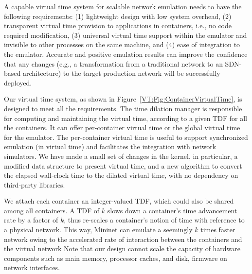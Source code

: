 A capable virtual time system for scalable network emulation needs to have the following requirements:
(1) lightweight design with low system overhead,
(2) transparent virtual time provision to applications in containers, i.e., no code required modification,
(3) universal virtual time support within the emulator and invisible to other processes on the same machine, and
(4) ease of integration to the emulator. 
Accurate and positive emulation results can improve the confidence that any changes
(e.g., a transformation from a traditional network to an SDN-based architecture) to the target production network will be successfully deployed. 

\begin{figure*}
    \centering
    \caption[Virtual Time System Design]{Architecture of the Virtual Time System in a Container-based Network Emulator.
    Note that a typical container-based network emulator can be presented by this figure without the Virtual Time Middleware.}
    \label{VT:Fig:ContainerVirtualTime}
\end{figure*}

Our virtual time system, as shown in Figure~\ref{VT:Fig:ContainerVirtualTime}, is designed to meet all the requirements. 
The time dilation manager is responsible for computing and maintaining the virtual time, according to a given TDF for all the containers. 
It can offer per-container virtual time or the global virtual time for the emulator.
The per-container virtual time is useful to support synchronized emulation (in virtual time) and facilitates the integration with network simulators. 
We have made a small set of changes in the kernel, in particular, a modified data structure to present virtual time,
and a new algorithm to convert the elapsed wall-clock time to the dilated virtual time, with no dependency on third-party libraries.

We attach each container an integer-valued TDF, which could also be shared among all containers. 
A TDF of $k$ slows down a container's time advancement rate by a factor of $k$, thus re-scales a container's notion of time with reference to a physical network. 
This way, Mininet can emulate a seemingly $k$ times faster network owing to the accelerated rate of interaction between the containers and the virtual network
Note that our design cannot scale the capacity of hardware components such as main memory, processor caches, and disk, firmware on network interfaces. 

